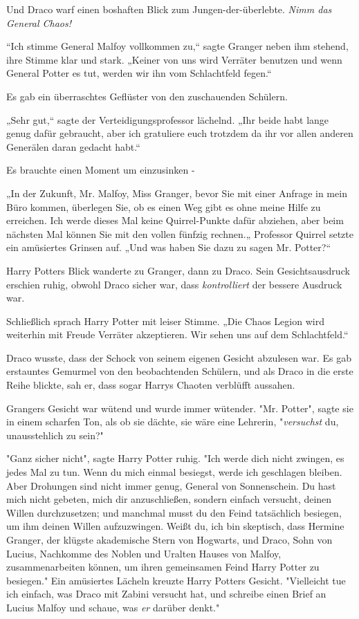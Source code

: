 {Und Draco warf einen boshaften Blick zum Jungen-der-überlebte. \emph{Nimm das General Chaos!}

“Ich stimme General Malfoy vollkommen zu,“ sagte Granger neben ihm stehend, ihre Stimme klar und stark. „Keiner von uns wird Verräter benutzen und wenn General Potter es tut, werden wir ihn vom Schlachtfeld fegen.“

Es gab ein überraschtes Geflüster von den zuschauenden Schülern.

„Sehr gut,“ sagte der Verteidigungsprofessor lächelnd. „Ihr beide habt lange genug dafür gebraucht, aber ich gratuliere euch trotzdem da ihr vor allen anderen Generälen daran gedacht habt.“

Es brauchte einen Moment um einzusinken -

„In der Zukunft, Mr. Malfoy, Miss Granger, bevor Sie mit einer Anfrage in mein Büro kommen, überlegen Sie, ob es einen Weg gibt es ohne meine Hilfe zu erreichen. Ich werde dieses Mal keine Quirrel-Punkte dafür abziehen, aber beim nächsten Mal können Sie mit den vollen fünfzig rechnen.„ Professor Quirrel setzte ein amüsiertes Grinsen auf. „Und was haben Sie dazu zu sagen Mr. Potter?“

Harry Potters Blick wanderte zu Granger, dann zu Draco. Sein Gesichtsausdruck erschien ruhig, obwohl Draco sicher war, dass \emph{kontrolliert} der bessere Ausdruck war.

Schließlich sprach Harry Potter mit leiser Stimme. „Die Chaos Legion wird weiterhin mit Freude Verräter akzeptieren. Wir sehen uns auf dem Schlachtfeld.“

Draco wusste, dass der Schock von seinem eigenen Gesicht abzulesen war. Es gab erstauntes Gemurmel von den beobachtenden Schülern, und als Draco in die erste Reihe blickte, sah er, dass sogar Harrys Chaoten verblüfft aussahen.

Grangers Gesicht war wütend und wurde immer wütender. "Mr. Potter", sagte sie in einem scharfen Ton, als ob sie dächte, sie wäre eine Lehrerin, "\emph{versuchst} du, unausstehlich zu sein?"

"Ganz sicher nicht", sagte Harry Potter ruhig. "Ich werde dich nicht zwingen, es jedes Mal zu tun. Wenn du mich einmal besiegst, werde ich geschlagen bleiben. Aber Drohungen sind nicht immer genug, General von Sonnenschein. Du hast mich nicht gebeten, mich dir anzuschließen, sondern einfach versucht, deinen Willen durchzusetzen; und manchmal musst du den Feind tatsächlich besiegen, um ihm deinen Willen aufzuzwingen. Weißt du, ich bin skeptisch, dass Hermine Granger, der klügste akademische Stern von Hogwarts, und Draco, Sohn von Lucius, Nachkomme des Noblen und Uralten Hauses von Malfoy, zusammenarbeiten können, um ihren gemeinsamen Feind Harry Potter zu besiegen." Ein amüsiertes Lächeln kreuzte Harry Potters Gesicht. "Vielleicht tue ich einfach, was Draco mit Zabini versucht hat, und schreibe einen Brief an Lucius Malfoy und schaue, was \emph{er} darüber denkt."

}

